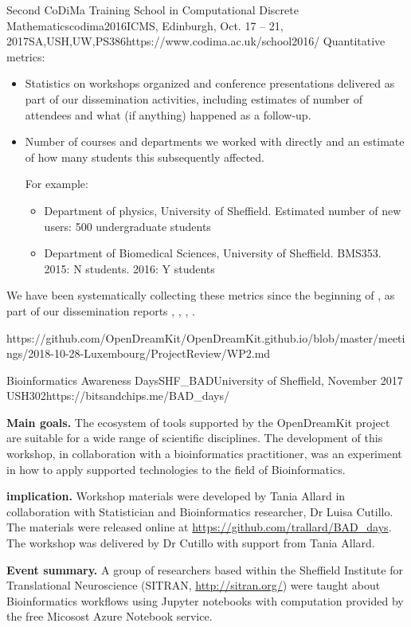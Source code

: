 \begin{Aim 1}
\begin{Aim 2}
\begin{event}{Second CoDiMa Training School in Computational Discrete Mathematics}{codima2016}{ICMS, Edinburgh, Oct. 17 -- 21, 2017}{SA,USH,UW,PS}{38}{6}{https://www.codima.ac.uk/school2016/}
Quantitative metrics:
\begin{itemize}
\item Statistics on workshops organized and conference presentations
  delivered as part of our dissemination activities, including
  estimates of number of attendees and what (if anything) happened as
  a follow-up.
\item Number of courses and departments we worked with directly and an
  estimate of how many students this subsequently affected.

  For example:
  \begin{itemize}
  \item Department of physics, University of Sheffield. Estimated
    number of new users: 500 undergraduate students
  \item Department of Biomedical Sciences, University of Sheffield.
    BMS353. 2015: N students. 2016: Y students
  \end{itemize}
\end{itemize}

We have been systematically collecting these metrics since the
beginning of \ODK, as part of our dissemination reports
, ,
, .


https://github.com/OpenDreamKit/OpenDreamKit.github.io/blob/master/meetings/2018-10-28-Luxembourg/ProjectReview/WP2.md




\begin{event}{Bioinformatics Awareness Days}{SHF_BAD}{University of Sheffield, November 2017 }{USH}{30}{2}{https://bitsandchips.me/BAD_days/}

\textbf{Main goals.} The ecosystem of tools supported by the OpenDreamKit project are suitable for a wide range of scientific disciplines. The development of this workshop, in collaboration with a bioinformatics practitioner, was an experiment in how to apply \ODK supported technologies to the field of Bioinformatics.

\textbf{\ODK implication.} Workshop materials were developed by Tania Allard in collaboration with Statistician and Bioinformatics researcher, Dr Luisa Cutillo.  The materials were released online at \url{https://github.com/trallard/BAD_days}. The workshop was delivered by Dr Cutillo with support from Tania Allard.

\textbf{Event summary.} A group of researchers based within the Sheffield Institute for Translational Neuroscience (SITRAN, \url{http://sitran.org/}) were taught about Bioinformatics workflows using Jupyter notebooks with computation provided by the free Micosost Azure Notebook service.


\end{event}
\end{event}
\end{Aim 2}
\end{Aim 1}
